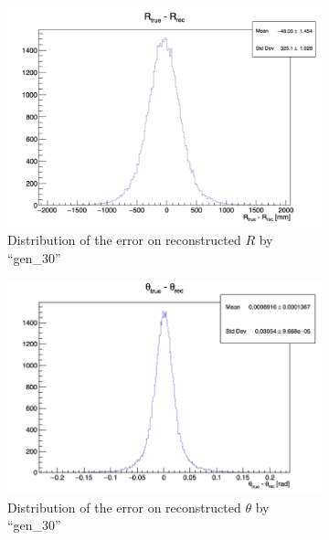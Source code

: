 \begin{figure}[ht]
  \begin{subfigure}[t]{0.32\linewidth}
    \centering
    \includegraphics[width=\linewidth]{images/jcnn/vic_cnn/cnn_delta_r.png}
    \caption{Distribution of the error on reconstructed $R$ by ``gen\_30''}
    \label{fig:jcnn:vic_cnn:cnn_delta_r}
  \end{subfigure}
  \begin{subfigure}[t]{0.32\linewidth}
    \centering
    \includegraphics[width=\linewidth]{images/jcnn/vic_cnn/cnn_delta_theta.png}
    \caption{Distribution of the error on reconstructed $\theta$ by ``gen\_30''}
    \label{fig:jcnn:vic_cnn:cnn_delta_theta}
  \end{subfigure}
  \begin{subfigure}[t]{0.32\linewidth}
    \centering

\end{subfigure}
\end{figure}
